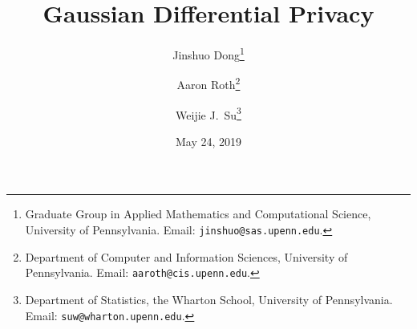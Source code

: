 \documentclass[11pt]{article}
\theoremstyle{remark}
\begin{document}
\title{Gaussian Differential Privacy}


\author{Jinshuo Dong\thanks{Graduate Group in Applied Mathematics and Computational Science, University of Pennsylvania. Email: \texttt{jinshuo@sas.upenn.edu}.} \and Aaron Roth\thanks{Department of Computer and Information Sciences, University of Pennsylvania. Email: \texttt{aaroth@cis.upenn.edu}.} \and Weijie J.~Su\thanks{Department of Statistics, the Wharton School, University of Pennsylvania. Email: \texttt{suw@wharton.upenn.edu}.}}




\date{May 24, 2019}


\maketitle
\end{document}
